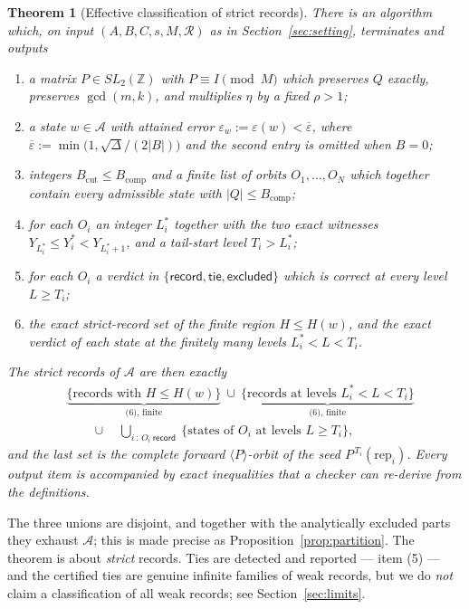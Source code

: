 \documentclass[11pt]{article}
\newtheorem{theorem}{Theorem}[section]
\theoremstyle{definition}
\theoremstyle{remark}
\newcommand{\Z}{\mathbb{Z}}
\newcommand{\adm}{\mathcal{A}}
\newcommand{\epsbar}{\overline{\varepsilon}}
\newcommand{\epsw}{\varepsilon_w}
\begin{document}
\begin{theorem}[Effective classification of strict records]\label{thm:main}
There is an algorithm which, on input $(A,B,C,s,M,\mathcal R)$ as in Section~\ref{sec:setting},
terminates and outputs
\begin{enumerate}\itemsep2pt
\item a matrix $P\in SL_2(\Z)$ with $P\equiv I\pmod M$ which preserves $Q$ exactly, preserves
$\gcd(m,k)$, and multiplies $\eta$ by a fixed $\rho>1$;
\item a state $w\in\adm$ with attained error $\epsw:=\varepsilon(w)<\epsbar$, where
$\epsbar:=\min\bigl(1,\sqrt\Delta/(2|B|)\bigr)$ and the second entry is omitted when $B=0$;
\item integers $B_{\mathrm{cut}}\le B_{\mathrm{comp}}$ and a finite list of orbits
$O_1,\dots,O_N$ which together contain every admissible state with $|Q|\le B_{\mathrm{comp}}$;
\item for each $O_i$ an integer $L_i^{*}$ together with the two exact witnesses
$Y_{L_i^{*}}\le Y_i^{*}<Y_{L_i^{*}+1}$, and a tail-start level $T_i>L_i^{*}$;
\item for each $O_i$ a verdict in $\{\textsf{record},\textsf{tie},\textsf{excluded}\}$ which is
correct at \emph{every} level $L\ge T_i$;
\item the exact strict-record set of the finite region $H\le H(w)$, and the exact verdict of
each state at the finitely many levels $L_i^{*}<L<T_i$.
\end{enumerate}
The strict records of $\adm$ are then exactly
\begin{align*}
&\underbrace{\{\text{records with }H\le H(w)\}}_{\text{(6), finite}}
\ \cup\
\underbrace{\{\text{records at levels }L_i^{*}<L<T_i\}}_{\text{(6), finite}}\\[2pt]
&\qquad\cup\quad
\bigcup_{i\,:\,O_i\ \textsf{record}}\ \bigl\{\text{states of }O_i\text{ at levels }
L\ge T_i\bigr\},
\end{align*}
and the last set is the complete forward $\langle P\rangle$-orbit of the seed
$P^{\,T_i}(\text{rep}_i)$. Every output item is accompanied by exact inequalities that a
checker can re-derive from the definitions.
\end{theorem}

The three unions are disjoint, and together with the analytically excluded parts they exhaust
$\adm$; this is made precise as Proposition~\ref{prop:partition}. The theorem is about
\emph{strict} records. Ties are detected and reported --- item (5) --- and the certified ties
are genuine infinite families of weak records, but we do \emph{not} claim a classification of
all weak records; see Section~\ref{sec:limits}.
\end{document}
